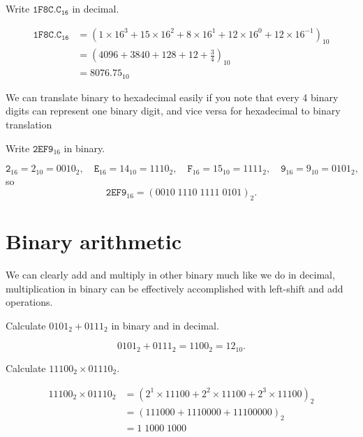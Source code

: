 \begin{example}
    Write $\mathtt{1F8C.C_{16}}$ in decimal.
\end{example}

\begin{solution}
    \begin{align*}
        \mathtt{1F8C.C_{16}} &= (1 \times 16^3 + 15 \times 16^2 + 8 \times 16^1 + 12 \times 16^0 + 12 \times 16^{-1})_{10} \\
        &= \left( 4096 + 3840 + 128 + 12 + \frac34 \right)_{10} \\
        &= 8076.75_{10}
    \end{align*}
\end{solution}

We can translate binary to hexadecimal easily if you note that every 4 binary digits can represent one binary digit, and vice versa for hexadecimal to binary translation

\begin{example}
    Write $\mathtt{2EF9}_{16}$ in binary.
\end{example}

\begin{solution}
    \[ \mathtt{2}_{16} = 2_{10} = 0010_2, \quad \mathtt{E}_{16} = 14_{10} = 1110_2, \quad \mathtt{F}_{16} = 15_{10} = 1111_2, \quad \mathtt{9}_{16} = 9_{10} = 0101_2, \] so \[ \mathtt{2EF9}_{16} = (0010 \; 1110 \; 1111 \; 0101)_2. \]
\end{solution}

\section{Binary arithmetic}

We can clearly add and multiply in other binary much like we do in decimal, multiplication in binary can be effectively accomplished with left-shift and add operations.

\begin{example}
    Calculate $0101_2 + 0111_2$ in binary and in decimal.
\end{example}

\begin{solution}
    \[ 0101_2 + 0111_2 = 1100_2 = 12_{10}. \]
\end{solution}

\begin{example}
    Calculate $11100_2 \times 01110_2$.
\end{example}

\begin{solution}
    \begin{align*}
        11100_2 \times 01110_2 &= (2^1 \times 11100 + 2^2 \times 11100 + 2^3 \times 11100)_2 \\
        &= (111000 + 1110000 + 11100000)_2 \\
        &= 1 \; 1000 \; 1000
    \end{align*}
\end{solution}


